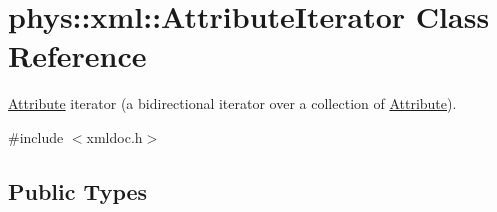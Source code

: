 \hypertarget{classphys_1_1xml_1_1AttributeIterator}{
\section{phys::xml::AttributeIterator Class Reference}
\label{de/d78/classphys_1_1xml_1_1AttributeIterator}
}


\hyperlink{classphys_1_1xml_1_1Attribute}{Attribute} iterator (a bidirectional iterator over a collection of \hyperlink{classphys_1_1xml_1_1Attribute}{Attribute}).  




{\ttfamily \#include $<$xmldoc.h$>$}

\subsection*{Public Types}
